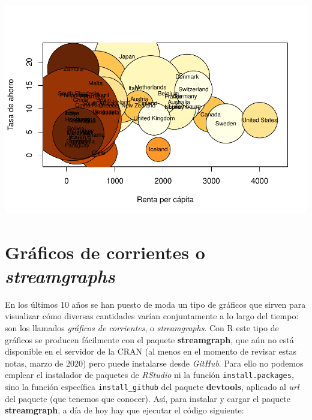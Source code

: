 \documentclass[
]{book}
\newenvironment{Shaded}{\begin{snugshade}}{\end{snugshade}}
\newcommand{\DataTypeTok}[1]{\textcolor[rgb]{0.13,0.29,0.53}{#1}}
\newcommand{\FloatTok}[1]{\textcolor[rgb]{0.00,0.00,0.81}{#1}}
\newcommand{\KeywordTok}[1]{\textcolor[rgb]{0.13,0.29,0.53}{\textbf{#1}}}
\newcommand{\NormalTok}[1]{#1}
\newcommand{\OperatorTok}[1]{\textcolor[rgb]{0.81,0.36,0.00}{\textbf{#1}}}
\newcommand{\StringTok}[1]{\textcolor[rgb]{0.31,0.60,0.02}{#1}}
\theoremstyle{definition}
\theoremstyle{definition}
\theoremstyle{definition}
\theoremstyle{remark}
\begin{document}
\begin{Shaded}
\end{Shaded}

\begin{center}\includegraphics[width=0.9\linewidth]{14cap13_EDextra_files/figure-latex/unnamed-chunk-36-1} \end{center}

\hypertarget{gruxe1ficos-de-corrientes-o-streamgraphs}{%
\section{\texorpdfstring{Gráficos de corrientes o \emph{streamgraphs}}{Gráficos de corrientes o streamgraphs}}\label{gruxe1ficos-de-corrientes-o-streamgraphs}}

En los últimos 10 años se han puesto de moda un tipo de gráficos que sirven para visualizar cómo diversas cantidades varían conjuntamente a lo largo del tiempo: son los llamados \emph{gráficos de corrientes}, o \emph{streamgraphs}. Con R este tipo de gráficos se producen fácilmente con el paquete \textbf{streamgraph}, que aún no está disponible en el servidor de la CRAN (al menos en el momento de revisar estas notas, marzo de 2020) pero puede instalarse desde \emph{GitHub}. Para ello no podemos emplear el instalador de paquetes de \emph{RStudio} ni la función \texttt{install.packages}, sino la función específica \verb+install_github+ del paquete \textbf{devtools}, aplicado al \emph{url} del paquete (que tenemos que conocer). Así, para instalar y cargar el paquete \textbf{streamgraph}, a día de hoy hay que ejecutar el código siguiente:
\end{document}
